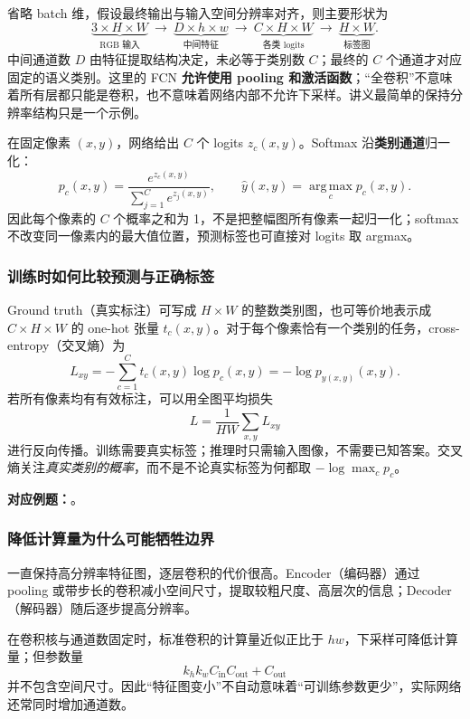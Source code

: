 省略 batch 维，假设最终输出与输入空间分辨率对齐，则主要形状为
\[
  \underbrace{3\times H\times W}_{\text{RGB 输入}}
  \ \longrightarrow\ \underbrace{D\times h\times w}_{\text{中间特征}}
  \ \longrightarrow\ \underbrace{C\times H\times W}_{\text{各类 logits}}
  \ \longrightarrow\ \underbrace{H\times W}_{\text{标签图}}.
\]
中间通道数 $D$ 由特征提取结构决定，未必等于类别数 $C$；最终的 $C$ 个通道才对应固定的语义类别。这里的 FCN \textbf{允许使用 pooling 和激活函数}；“全卷积”不意味着所有层都只能是卷积，也不意味着网络内部不允许下采样。讲义最简单的保持分辨率结构只是一个示例。

在固定像素 $(x,y)$，网络给出 $C$ 个 logits $z_c(x,y)$。Softmax 沿\textbf{类别通道}归一化：
\[
  p_c(x,y)=\frac{e^{z_c(x,y)}}{\sum_{j=1}^{C}e^{z_j(x,y)}},\qquad
  \widehat y(x,y)=\operatorname*{arg\,max}_c p_c(x,y).
\]
因此每个像素的 $C$ 个概率之和为 1，不是把整幅图所有像素一起归一化；softmax 不改变同一像素内的最大值位置，预测标签也可直接对 logits 取 argmax。

\subsubsection*{训练时如何比较预测与正确标签}

Ground truth（真实标注）可写成 $H\times W$ 的整数类别图，也可等价地表示成 $C\times H\times W$ 的 one-hot 张量 $t_c(x,y)$。对于每个像素恰有一个类别的任务，cross-entropy（交叉熵）为
\[
  \boxed{L_{xy}=-\sum_{c=1}^{C}t_c(x,y)\log p_c(x,y)
  =-\log p_{y(x,y)}(x,y)}.
\]
若所有像素均有有效标注，可以用全图平均损失
\[
  L=\frac{1}{HW}\sum_{x,y}L_{xy}
\]
进行反向传播。训练需要真实标签；推理时只需输入图像，不需要已知答案。交叉熵关注\emph{真实类别的概率}，而不是不论真实标签为何都取 $-\log\max_c p_c$。

\textbf{对应例题：}。


\subsubsection*{降低计算量为什么可能牺牲边界}

一直保持高分辨率特征图，逐层卷积的代价很高。Encoder（编码器）通过 pooling 或带步长的卷积减小空间尺寸，提取较粗尺度、高层次的信息；Decoder（解码器）随后逐步提高分辨率。

在卷积核与通道数固定时，标准卷积的计算量近似正比于 $hw$，下采样可降低计算量；但参数量
\[
  k_hk_w C_{\mathrm{in}}C_{\mathrm{out}}+C_{\mathrm{out}}
\]
并不包含空间尺寸。因此“特征图变小”不自动意味着“可训练参数更少”，实际网络还常同时增加通道数。

